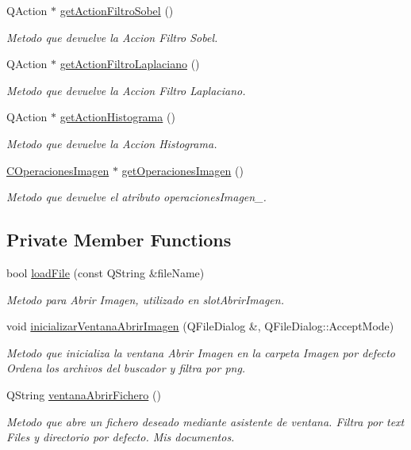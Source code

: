 \begin{DoxyCompactItemize}
Q\+Action $\ast$ \hyperlink{classCAplicacion_a4c7a3e1bf75bee8ba9a8c6a092c4b55e}{get\+Action\+Filtro\+Sobel} ()
\begin{DoxyCompactList}\small\item\em Metodo que devuelve la Accion Filtro Sobel. \end{DoxyCompactList}\item 
Q\+Action $\ast$ \hyperlink{classCAplicacion_a9e3487513378f95c231dd8806222f126}{get\+Action\+Filtro\+Laplaciano} ()
\begin{DoxyCompactList}\small\item\em Metodo que devuelve la Accion Filtro Laplaciano. \end{DoxyCompactList}\item 
Q\+Action $\ast$ \hyperlink{classCAplicacion_a297c40499e1dc0a7fe428846df8b37b6}{get\+Action\+Histograma} ()
\begin{DoxyCompactList}\small\item\em Metodo que devuelve la Accion Histograma. \end{DoxyCompactList}\item 
\hyperlink{classCOperacionesImagen}{C\+Operaciones\+Imagen} $\ast$ \hyperlink{classCAplicacion_acf0f5ed748482f7957bee4db4dadf840}{get\+Operaciones\+Imagen} ()
\begin{DoxyCompactList}\small\item\em Metodo que devuelve el atributo operaciones\+Imagen\+\_\+. \end{DoxyCompactList}\end{DoxyCompactItemize}
\subsection*{Private Member Functions}
\begin{DoxyCompactItemize}
\item 
bool \hyperlink{classCAplicacion_a7802ee67b172b877ddd0f3ac99a7d96e}{load\+File} (const Q\+String \&file\+Name)
\begin{DoxyCompactList}\small\item\em Metodo para Abrir Imagen, utilizado en slot\+Abrir\+Imagen. \end{DoxyCompactList}\item 
void \hyperlink{classCAplicacion_a9d66dd978838dd5b4c99ddb02a9e43a1}{inicializar\+Ventana\+Abrir\+Imagen} (Q\+File\+Dialog \&, Q\+File\+Dialog\+::\+Accept\+Mode)
\begin{DoxyCompactList}\small\item\em Metodo que inicializa la ventana Abrir Imagen en la carpeta Imagen por defecto Ordena los archivos del buscador y filtra por png. \end{DoxyCompactList}\item 
Q\+String \hyperlink{classCAplicacion_a66f53bbf6ae42a812a449bd96610e702}{ventana\+Abrir\+Fichero} ()
\begin{DoxyCompactList}\small\item\em Metodo que abre un fichero deseado mediante asistente de ventana. Filtra por text Files y directorio por defecto. Mis documentos. \end{DoxyCompactList}\end{DoxyCompactItemize}
